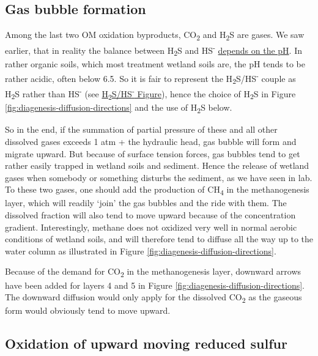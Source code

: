 \documentclass[]{book}
\theoremstyle{definition}
\theoremstyle{definition}
\theoremstyle{definition}
\theoremstyle{remark}
\begin{document}
\subsection{Gas bubble formation}\label{gas-bubble-formation}

Among the last two OM oxidation byproducts, CO\textsubscript{2} and
H\textsubscript{2}S are gases. We saw earlier, that in reality the
balance between H\textsubscript{2}S and HS\textsuperscript{-}
\protect\hyperlink{H2S}{depends on the pH}. In rather organic soils,
which most treatment wetland soils are, the pH tends to be rather
acidic, often below 6.5. So it is fair to represent the
H\textsubscript{2}S/HS\textsuperscript{-} couple as H\textsubscript{2}S
rather than HS\textsuperscript{-} (see
\protect\hyperlink{H2S}{H\textsubscript{2}S/HS\textsuperscript{-}
Figure}), hence the choice of H\textsubscript{2}S in Figure
\ref{fig:diagenesis-diffusion-directions} and the use of
H\textsubscript{2}S below.

So in the end, if the summation of partial pressure of these and all
other dissolved gases exceeds 1 atm + the hydraulic head, gas bubble
will form and migrate upward. But because of surface tension forces, gas
bubbles tend to get rather easily trapped in wetland soils and sediment.
Hence the release of wetland gases when somebody or something disturbs
the sediment, as we have seen in lab. To these two gases, one should add
the production of CH\textsubscript{4} in the methanogenesis layer, which
will readily `join' the gas bubbles and the ride with them. The
dissolved fraction will also tend to move upward because of the
concentration gradient. Interestingly, methane does not oxidized very
well in normal aerobic conditions of wetland soils, and will therefore
tend to diffuse all the way up to the water column as illustrated in
Figure \ref{fig:diagenesis-diffusion-directions}.

Because of the demand for CO\textsubscript{2} in the methanogenesis
layer, downward arrows have been added for layers 4 and 5 in Figure
\ref{fig:diagenesis-diffusion-directions}. The downward diffusion would
only apply for the dissolved CO\textsubscript{2} as the gaseous form
would obviously tend to move upward.

\subsection{Oxidation of upward moving reduced
sulfur}\label{oxidation-of-upward-moving-reduced-sulfur}
\end{document}
